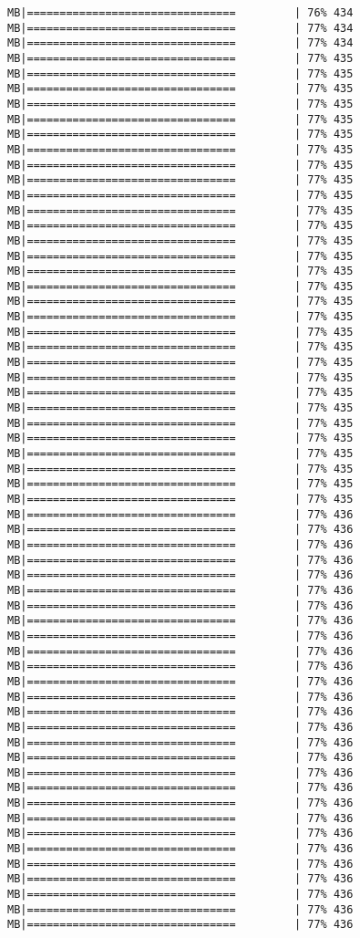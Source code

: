 \documentclass[
]{article}
\begin{document}
\begin{verbatim}
MB|================================         | 76% 434 MB|================================         | 77% 434 MB|================================         | 77% 434 MB|================================         | 77% 435 MB|================================         | 77% 435 MB|================================         | 77% 435 MB|================================         | 77% 435 MB|================================         | 77% 435 MB|================================         | 77% 435 MB|================================         | 77% 435 MB|================================         | 77% 435 MB|================================         | 77% 435 MB|================================         | 77% 435 MB|================================         | 77% 435 MB|================================         | 77% 435 MB|================================         | 77% 435 MB|================================         | 77% 435 MB|================================         | 77% 435 MB|================================         | 77% 435 MB|================================         | 77% 435 MB|================================         | 77% 435 MB|================================         | 77% 435 MB|================================         | 77% 435 MB|================================         | 77% 435 MB|================================         | 77% 435 MB|================================         | 77% 435 MB|================================         | 77% 435 MB|================================         | 77% 435 MB|================================         | 77% 435 MB|================================         | 77% 435 MB|================================         | 77% 435 MB|================================         | 77% 435 MB|================================         | 77% 435 MB|================================         | 77% 436 MB|================================         | 77% 436 MB|================================         | 77% 436 MB|================================         | 77% 436 MB|================================         | 77% 436 MB|================================         | 77% 436 MB|================================         | 77% 436 MB|================================         | 77% 436 MB|================================         | 77% 436 MB|================================         | 77% 436 MB|================================         | 77% 436 MB|================================         | 77% 436 MB|================================         | 77% 436 MB|================================         | 77% 436 MB|================================         | 77% 436 MB|================================         | 77% 436 MB|================================         | 77% 436 MB|================================         | 77% 436 MB|================================         | 77% 436 MB|================================         | 77% 436 MB|================================         | 77% 436 MB|================================         | 77% 436 MB|================================         | 77% 436 MB|================================         | 77% 436 MB|================================         | 77% 436 MB|================================         | 77% 436 MB|================================         | 77% 436 MB|================================         | 77% 436 
\end{verbatim}
\end{document}
